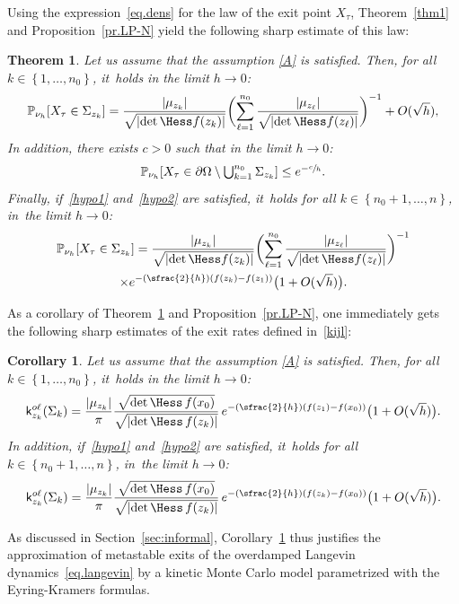 \documentclass[10pt]{amsart}
\newcommand{\Psfrac}[2]{(\sfrac{#1}{#2})}
\let\ts\textstyle
\theoremstyle{plain}
\newtheorem{theorem}{Theorem}
\newtheorem{corollary}[proposition]{Corollary}
\theoremstyle{definition}
\begin{document}
Using the expression~\eqref{eq.dens} for the law of the exit point $X_\tau$, Theorem~\ref{thm1} and Proposition~\ref{pr.LP-N} yield the following
sharp estimate of this law:
\begin{theorem}\label{thm2}
Let us assume that the assumption \ref{A} is satisfied. Then, for all $k\in \left\{1,\ldots,n_0\right\}$, it~holds in the limit $h\to 0$:
\begin{equation}\label{eq.puh1}
\mathbb P_{\nu_h}[X_{\tau}\in \Sigma_{z_k}]= \frac{ \vert \mu_{z_k}\vert }{\sqrt{\vert {\det \Hess f (z_k)} \vert } }
\biggl (\sum_{\ell=1}^{n_0} \frac{ \vert \mu_{z_\ell}\vert }{\sqrt{\vert {\det \Hess f (z_\ell)} \vert } } \biggr)^{-1} + O({\sqrt h}),
\end{equation}
In addition, there exists $c>0$ such that in the limit $h\to 0$:
\begin{equation}\label{eq.puh2}\ts
\mathbb P_{\nu_h}[X_{\tau}\in \partial \Omega \setminus \bigcup_{k=1}^{n_0}\Sigma_{z_k}]\le e^{-\sfrac{c}{h}}.
\end{equation}
Finally, if~\eqref{hypo1} and~\eqref{hypo2} are satisfied, it~holds for all $k\in \left\{n_0+1,\ldots,n\right\}$, in~the limit $h\to 0$:
\begin{multline}\label{eq.puh3}
\mathbb P_{\nu_h}[X_{\tau}\in \Sigma_{z_k}]=\frac{ \vert \mu_{z_k}\vert }{\sqrt{\vert {\det \Hess f (z_k)} \vert } }
\biggl (\sum_{\ell=1}^{n_0} \frac{ \vert \mu_{z_\ell}\vert }{\sqrt{
\vert {\det \Hess f (z_\ell)} \vert } } \biggr)^{-1} \\
\times e^{-\Psfrac{2}{h}(f(z_k)-f(z_1))}\bigl(1+ O({\sqrt h})
\bigr).
\end{multline}
\end{theorem}

As a corollary of Theorem~\ref{thm2} and Proposition~\ref{pr.LP-N},
one immediately gets the following sharp estimates of the exit rates defined in~\eqref{kijl}:
\begin{corollary}\label{co.ek}
Let us assume that the assumption \ref{A} is satisfied.
Then, for all $k\in \left\{1,\ldots,n_0\right\} $, it~holds in the limit $h\to 0$:
\begin{equation}\label{eq.k*1}
\mathsf k_{z_k}^{o\ell}(\Sigma_k)= \frac{\vert \mu_{z_k}\vert}{\pi }\frac{ \sqrt{{\det\Hess}\, f (x_0) } }{ \sqrt{\vert {\det \Hess}\, f(z_k) \vert } } \,e^{-\Psfrac{2}{h}(f(z_1)-f(x_0))}\bigl(1+ O({\sqrt h}) \bigr).
\end{equation}
In addition, if~\eqref{hypo1} and~\eqref{hypo2} are satisfied, it~holds for all $k\in \left\{n_0+1,\ldots,n\right\}$, in~the limit $h\to 0$:
\begin{equation}\label{eq.k*2}
\mathsf k_{z_k}^{o\ell}(\Sigma_k)= \frac{\vert \mu_{z_k}\vert}{\pi }\frac{ \sqrt{{\det\Hess}\, f (x_0) } }{ \sqrt{\vert {\det \Hess}\, f(z_k) \vert } } \,e^{-\Psfrac{2}{h}(f(z_k)-f(x_0))}\bigl(1+ O({\sqrt h}) \bigr).
\end{equation}
\end{corollary}
As discussed in Section~\ref{sec:informal}, Corollary~\ref{co.ek}
thus justifies the approximation of metastable exits of the overdamped Langevin
dynamics~\eqref{eq.langevin} by a kinetic Monte Carlo model
parametrized with the Eyring-Kramers formulas.
\end{document}
